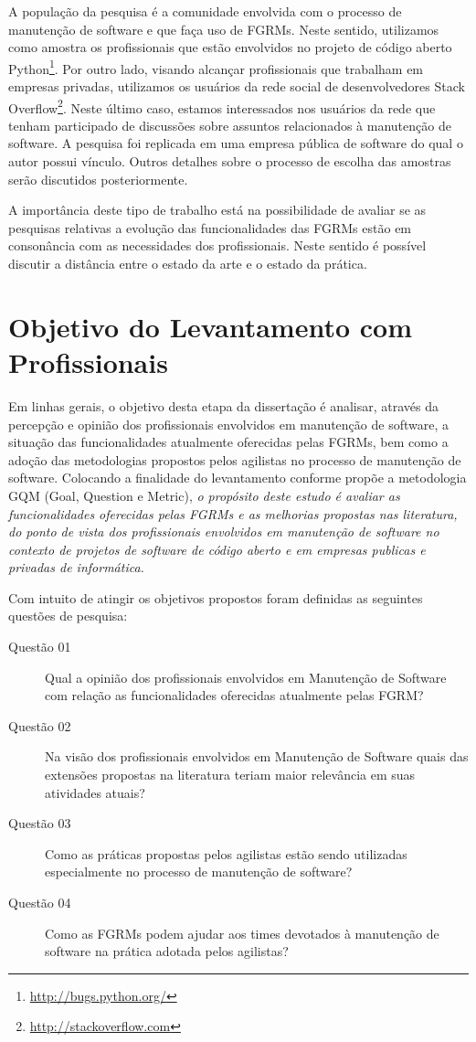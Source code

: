A população da pesquisa é a comunidade envolvida com o processo de manutenção de
software e que faça uso de FGRMs. Neste sentido, utilizamos como amostra os
profissionais que estão envolvidos no projeto de código aberto
Python\footnote{\url{http://bugs.python.org/}}. Por outro lado, visando alcançar
profissionais que trabalham em empresas privadas, utilizamos os usuários da
rede social de desenvolvedores Stack
Overflow\footnote{\url{http://stackoverflow.com}}. Neste último caso, estamos
interessados nos usuários da rede que tenham participado de discussões sobre
assuntos relacionados à manutenção de software. A pesquisa foi replicada em uma
empresa pública de software do qual o autor possui vínculo. Outros detalhes
sobre o processo de escolha das amostras serão discutidos posteriormente.

A importância deste tipo de trabalho está na possibilidade de avaliar se as
pesquisas relativas a evolução das funcionalidades das FGRMs estão em
consonância com as necessidades dos profissionais. Neste sentido é possível
discutir a distância entre o estado da arte e o estado da prática.

\section{Objetivo do Levantamento com Profissionais}
\label{sec:objetivo_da_pesquisa_com_profissionais}

Em linhas gerais, o objetivo desta etapa da dissertação é analisar, através da
percepção e opinião dos profissionais envolvidos em manutenção de software, a
situação das funcionalidades atualmente oferecidas pelas FGRMs, bem como a
adoção das metodologias propostos pelos agilistas no processo de manutenção de
software. Colocando a finalidade do levantamento conforme propõe a metodologia
GQM (Goal, Question e Metric)\cite{gqm}, \textit{o propósito deste estudo é
    avaliar as funcionalidades oferecidas pelas FGRMs e as melhorias propostas
    nas literatura, do ponto de vista dos profissionais envolvidos em manutenção
    de software no contexto de projetos de software de código aberto e em
    empresas publicas e privadas de informática.}

Com intuito de atingir os objetivos propostos foram definidas as seguintes
questões de pesquisa:

\begin{description}
	\item[Questão 01] Qual a opinião dos profissionais envolvidos em Manutenção
		de Software com relação as funcionalidades oferecidas atualmente pelas
		FGRM\@?
	\item[Questão 02] Na visão dos profissionais envolvidos em Manutenção de
		Software quais das extensões propostas na literatura teriam maior
		relevância em suas atividades atuais?
	\item[Questão 03] Como as práticas propostas pelos agilistas estão sendo
	utilizadas especialmente no processo de manutenção de software?
	\item[Questão 04] Como as FGRMs podem ajudar aos times devotados à manutenção
	de software na prática adotada pelos agilistas?
\end{description}

